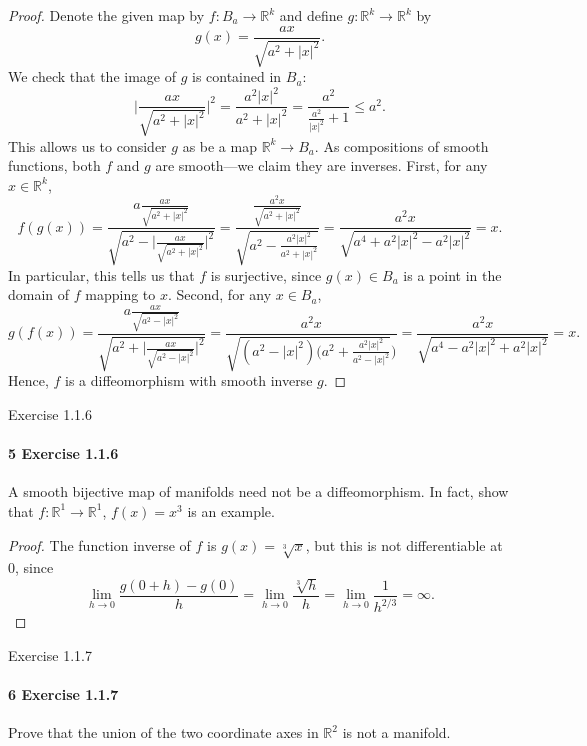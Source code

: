 \documentclass[12pt]{article}
\newlength{\myparskip}
\newenvironment{fullbox}{\begin{lrbox}{\savefullbox}\begin{minipage}{\dimexpr\textwidth-2\fboxsep\relax}\setlength{\parskip}{\myparskip}}{\end{minipage}\end{lrbox}\framebox[\textwidth]{\usebox{\savefullbox}}}
\newenvironment{pbox}[1][]{\begin{fullbox}\ifx#1\empty\else\paragraph{#1}\phantom{}\fi}{\end{fullbox}}
\theoremstyle{definition}
\newcommand{\R}{\mathbb{R}}
\newcommand{\<}{\langle}
\renewcommand{\>}{\rangle}
\begin{document}
\begin{proof}
    Denote the given map by $f : B_a \to \R^k$ and define $g : \R^k \to \R^k$ by
    \[
        g(x) = \frac{ax}{\sqrt{a^2 + |x|^2}}.
    \]
    We check that the image of $g$ is contained in $B_a$:
    \[
        \bigg|\frac{ax}{\sqrt{a^2 + |x|^2}}\bigg|^2
            = \frac{a^2|x|^2}{a^2 + |x|^2}
            = \frac{a^2}{\frac{a^2}{|x|^2} + 1}
            \leq a^2.
    \]
    This allows us to consider $g$ as be a map $\R^k \to B_a$.
    As compositions of smooth functions, both $f$ and $g$ are smooth---we claim they are inverses.
    First, for any $x \in \R^k$,
    \[
        f(g(x))
            = \frac{a\frac{ax}{\sqrt{a^2 + |x|^2}}}{\sqrt{a^2 - \Big|\frac{ax}{\sqrt{a^2 + |x|^2}}\Big|^2}}
            = \frac{\frac{a^2x}{\sqrt{a^2 + |x|^2}}}{\sqrt{a^2 - \frac{a^2|x|^2}{a^2 + |x|^2}}}
            = \frac{a^2x}{\sqrt{a^4 + a^2|x|^2 - a^2|x|^2}}
            = x.
    \]
    In particular, this tells us that $f$ is surjective, since $g(x) \in B_a$ is a point in the domain of $f$ mapping to $x$.
    Second, for any $x \in B_a$,
    \[
        g(f(x))
            = \frac{a\frac{ax}{\sqrt{a^2 - |x|^2}}}{\sqrt{a^2 + \Big|\frac{ax}{\sqrt{a^2 - |x|^2}}\Big|^2}}
            = \frac{a^2x}{\sqrt{(a^2 - |x|^2)\Big(a^2 + \frac{a^2|x|^2}{a^2 - |x|^2}}\Big)}
            = \frac{a^2x}{\sqrt{a^4 - a^2|x|^2 + a^2|x|^2}}
            = x.
    \]
    Hence, $f$ is a diffeomorphism with smooth inverse $g$.
\end{proof}

\begin{pbox}[5 Exercise 1.1.6]
    A smooth bijective map of manifolds need not be a diffeomorphism.
    In fact, show that $f : \R^1 \to \R^1$, $f(x) = x^3$ is an example.
\end{pbox}

\begin{proof}
    The function inverse of $f$ is $g(x) = \sqrt[3]{x}$, but this is not differentiable at $0$, since
    \[
        \lim_{h \to 0} \frac{g(0 + h) - g(0)}{h}
            = \lim_{h \to 0} \frac{\sqrt[3]{h}}{h}
            = \lim_{h \to 0} \frac{1}{h^{2/3}}
            = \infty.
    \]
\end{proof}

\begin{pbox}[6 Exercise 1.1.7]
    Prove that the union of the two coordinate axes in $\R^2$ is not a manifold.
\end{pbox}
\end{document}
